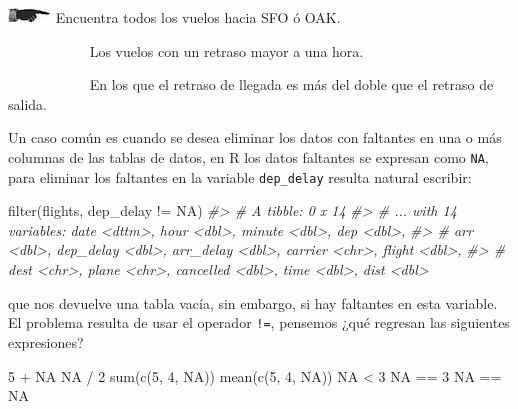 \documentclass[
]{book}
\newenvironment{Shaded}{\begin{snugshade}}{\end{snugshade}}
\newcommand{\CommentTok}[1]{\textcolor[rgb]{0.56,0.35,0.01}{\textit{#1}}}
\newcommand{\ConstantTok}[1]{\textcolor[rgb]{0.00,0.00,0.00}{#1}}
\newcommand{\DecValTok}[1]{\textcolor[rgb]{0.00,0.00,0.81}{#1}}
\newcommand{\FunctionTok}[1]{\textcolor[rgb]{0.00,0.00,0.00}{#1}}
\newcommand{\NormalTok}[1]{#1}
\newcommand{\SpecialCharTok}[1]{\textcolor[rgb]{0.00,0.00,0.00}{#1}}
\begin{document}
\includegraphics{imagenes/manicule2.jpg} Encuentra todos los vuelos hacia SFO ó OAK.

~~~~~~~~~~~ Los vuelos
con un retraso mayor a una hora.

~~~~~~~~~~~ En los que
el retraso de llegada es más del doble que el retraso de salida.

Un caso común es cuando se desea eliminar los datos con faltantes en una o más
columnas de las tablas de datos, en R los datos faltantes se expresan como \texttt{NA},
para eliminar los faltantes en la variable \texttt{dep\_delay} resulta natural escribir:

\begin{Shaded}
\begin{Highlighting}[]
\FunctionTok{filter}\NormalTok{(flights, dep\_delay }\SpecialCharTok{!=} \ConstantTok{NA}\NormalTok{)}
\CommentTok{\#\textgreater{} \# A tibble: 0 x 14}
\CommentTok{\#\textgreater{} \# ... with 14 variables: date \textless{}dttm\textgreater{}, hour \textless{}dbl\textgreater{}, minute \textless{}dbl\textgreater{}, dep \textless{}dbl\textgreater{},}
\CommentTok{\#\textgreater{} \#   arr \textless{}dbl\textgreater{}, dep\_delay \textless{}dbl\textgreater{}, arr\_delay \textless{}dbl\textgreater{}, carrier \textless{}chr\textgreater{}, flight \textless{}dbl\textgreater{},}
\CommentTok{\#\textgreater{} \#   dest \textless{}chr\textgreater{}, plane \textless{}chr\textgreater{}, cancelled \textless{}dbl\textgreater{}, time \textless{}dbl\textgreater{}, dist \textless{}dbl\textgreater{}}
\end{Highlighting}
\end{Shaded}

que nos devuelve una tabla vacía, sin embargo, si hay faltantes en esta
variable. El problema resulta de usar el operador \texttt{!=}, pensemos ¿qué regresan
las siguientes expresiones?

\begin{Shaded}
\begin{Highlighting}[]
\DecValTok{5} \SpecialCharTok{+} \ConstantTok{NA}
\ConstantTok{NA} \SpecialCharTok{/} \DecValTok{2}
\FunctionTok{sum}\NormalTok{(}\FunctionTok{c}\NormalTok{(}\DecValTok{5}\NormalTok{, }\DecValTok{4}\NormalTok{, }\ConstantTok{NA}\NormalTok{))}
\FunctionTok{mean}\NormalTok{(}\FunctionTok{c}\NormalTok{(}\DecValTok{5}\NormalTok{, }\DecValTok{4}\NormalTok{,  }\ConstantTok{NA}\NormalTok{))}
\ConstantTok{NA} \SpecialCharTok{\textless{}} \DecValTok{3}
\ConstantTok{NA} \SpecialCharTok{==} \DecValTok{3}
\ConstantTok{NA} \SpecialCharTok{==} \ConstantTok{NA}
\end{Highlighting}
\end{Shaded}
\end{document}
